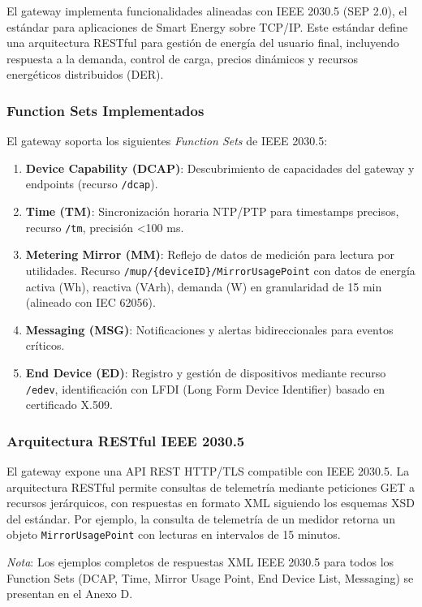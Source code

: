 El gateway implementa funcionalidades alineadas con IEEE 2030.5 (SEP 2.0), el estándar para aplicaciones de Smart Energy sobre TCP/IP. Este estándar define una arquitectura RESTful para gestión de energía del usuario final, incluyendo respuesta a la demanda, control de carga, precios dinámicos y recursos energéticos distribuidos (DER).

\subsubsection{Function Sets Implementados}

El gateway soporta los siguientes \textit{Function Sets} de IEEE 2030.5:

\begin{enumerate}
    \item \textbf{Device Capability (DCAP)}: Descubrimiento de capacidades del gateway y endpoints (recurso \texttt{/dcap}).
    \item \textbf{Time (TM)}: Sincronización horaria NTP/PTP para timestamps precisos, recurso \texttt{/tm}, precisión <100 ms.
    \item \textbf{Metering Mirror (MM)}: Reflejo de datos de medición para lectura por utilidades. Recurso \texttt{/mup/\{deviceID\}/MirrorUsagePoint} con datos de energía activa (Wh), reactiva (VArh), demanda (W) en granularidad de 15 min (alineado con IEC 62056).
    \item \textbf{Messaging (MSG)}: Notificaciones y alertas bidireccionales para eventos críticos.
    \item \textbf{End Device (ED)}: Registro y gestión de dispositivos mediante recurso \texttt{/edev}, identificación con LFDI (Long Form Device Identifier) basado en certificado X.509.
\end{enumerate}

\subsubsection{Arquitectura RESTful IEEE 2030.5}

El gateway expone una API REST HTTP/TLS compatible con IEEE 2030.5. La arquitectura RESTful permite consultas de telemetría mediante peticiones GET a recursos jerárquicos, con respuestas en formato XML siguiendo los esquemas XSD del estándar. Por ejemplo, la consulta de telemetría de un medidor retorna un objeto \texttt{MirrorUsagePoint} con lecturas en intervalos de 15 minutos.

\textit{Nota}: Los ejemplos completos de respuestas XML IEEE 2030.5 para todos los Function Sets (DCAP, Time, Mirror Usage Point, End Device List, Messaging) se presentan en el Anexo D.

